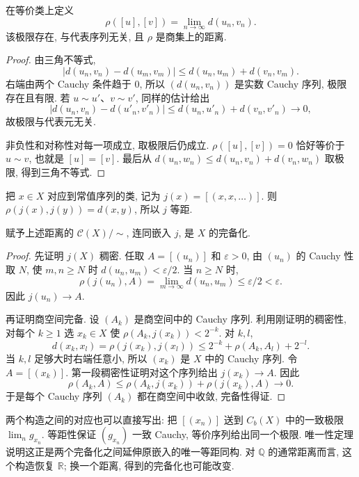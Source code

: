 \begin{proposition}\label{prop:cauchy-completion-distance}
在等价类上定义
\[
\rho([u],[v])=\lim_{n\to\infty}d(u_n,v_n).
\]
该极限存在, 与代表序列无关, 且 $\rho$ 是商集上的距离.
\end{proposition}
\begin{proof}
由三角不等式,
\[
|d(u_n,v_n)-d(u_m,v_m)|\leq d(u_n,u_m)+d(v_n,v_m).
\]
右端由两个 Cauchy 条件趋于 $0$, 所以 $(d(u_n,v_n))$ 是实数 Cauchy 序列, 极限存在且有限. 若 $u\sim u'$、$v\sim v'$, 同样的估计给出
\[
|d(u_n,v_n)-d(u'_n,v'_n)|
\leq d(u_n,u'_n)+d(v_n,v'_n)\longrightarrow0,
\]
故极限与代表元无关.

非负性和对称性对每一项成立, 取极限后仍成立. $\rho([u],[v])=0$ 恰好等价于 $u\sim v$, 也就是 $[u]=[v]$. 最后从
$d(u_n,w_n)\leq d(u_n,v_n)+d(v_n,w_n)$ 取极限, 得到三角不等式.
\end{proof}

把 $x\in X$ 对应到常值序列的类, 记为 $j(x)=[(x,x,\ldots)]$. 则
$\rho(j(x),j(y))=d(x,y)$, 所以 $j$ 等距.

\begin{theorem}\label{thm:cauchy-completion}
赋予上述距离的 $\mathcal C(X)/\!\sim$, 连同嵌入 $j$, 是 $X$ 的完备化.
\end{theorem}
\begin{proof}
先证明 $j(X)$ 稠密. 任取 $A=[(u_n)]$ 和 $\varepsilon>0$, 由 $(u_n)$ 的 Cauchy 性取 $N$, 使 $m,n\geq N$ 时 $d(u_n,u_m)<\varepsilon/2$. 当 $n\geq N$ 时,
\[
\rho(j(u_n),A)=\lim_{m\to\infty}d(u_n,u_m)
\leq\varepsilon/2<\varepsilon.
\]
因此 $j(u_n)\to A$.

再证明商空间完备. 设 $(A_k)$ 是商空间中的 Cauchy 序列. 利用刚证明的稠密性, 对每个 $k\geq1$ 选 $x_k\in X$ 使
$\rho(A_k,j(x_k))<2^{-k}$. 对 $k,l$,
\[
d(x_k,x_l)=\rho(j(x_k),j(x_l))
\leq 2^{-k}+\rho(A_k,A_l)+2^{-l}.
\]
当 $k,l$ 足够大时右端任意小, 所以 $(x_k)$ 是 $X$ 中的 Cauchy 序列. 令 $A=[(x_k)]$. 第一段稠密性证明对这个序列给出 $j(x_k)\to A$. 因此
\[
\rho(A_k,A)\leq\rho(A_k,j(x_k))+\rho(j(x_k),A)
\longrightarrow0.
\]
于是每个 Cauchy 序列 $(A_k)$ 都在商空间中收敛, 完备性得证.
\end{proof}

两个构造之间的对应也可以直接写出: 把 $[(x_n)]$ 送到 $C_b(X)$ 中的一致极限 $\lim_ng_{x_n}$. 等距性保证 $(g_{x_n})$ 一致 Cauchy, 等价序列给出同一个极限. 唯一性定理说明这正是两个完备化之间延伸原嵌入的唯一等距同构. 对 $\mathbb Q$ 的通常距离而言, 这个构造恢复 $\mathbb R$; 换一个距离, 得到的完备化也可能改变.


